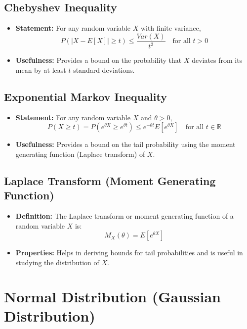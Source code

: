 \documentclass{article}
\begin{document}
\subsection*{Chebyshev Inequality}
\begin{itemize}
    \item \textbf{Statement:} For any random variable $X$ with finite variance,
    \[
    P(|X - E[X]| \ge t) \le \frac{Var(X)}{t^2} \quad \text{for all } t > 0
    \]
    \item \textbf{Usefulness:} Provides a bound on the probability that $X$ deviates from its mean by at least $t$ standard deviations.
\end{itemize}

\subsection*{Exponential Markov Inequality}
\begin{itemize}
    \item \textbf{Statement:} For any random variable $X$ and $\theta > 0$,
    \[
    P(X \ge t) = P(e^{\theta X} \ge e^{\theta t}) \le e^{-\theta t} E[e^{\theta X}] \quad \text{for all } t \in \mathbb{R}
    \]
    \item \textbf{Usefulness:} Provides a bound on the tail probability using the moment generating function (Laplace transform) of $X$.
\end{itemize}

\subsection*{Laplace Transform (Moment Generating Function)}
\begin{itemize}
    \item \textbf{Definition:} The Laplace transform or moment generating function of a random variable $X$ is:
    \[
    M_X(\theta) = E[e^{\theta X}]
    \]
    \item \textbf{Properties:} Helps in deriving bounds for tail probabilities and is useful in studying the distribution of $X$.
\end{itemize}




\section*{Normal Distribution (Gaussian Distribution)}
\end{document}
